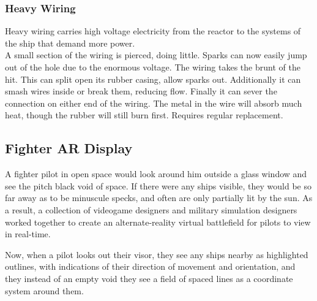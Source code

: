\documentclass[a4paper]{article}
\begin{document}
\vspace{-0.5cm} \hspace{-18pt} \subsubsection{Heavy Wiring} \label{grid_heavy_wiring} \vspace{-0.2cm}
Heavy wiring carries high voltage electricity from the reactor to the systems of the ship that demand more power.
\\ \pbhw
{A small section of the wiring is pierced, doing little. Sparks can now easily jump out of the hole due to the enormous voltage.}
{The wiring takes the brunt of the hit. This can split open its rubber casing, allow sparks out. Additionally it can smash wires inside or break them, reducing flow. Finally it can sever the connection on either end of the wiring.}
{The metal in the wire will absorb much heat, though the rubber will still burn first.}
{Requires regular replacement.}



\subsection{Fighter AR Display} \label{fighter}

A fighter pilot in open space would look around him outside a glass window and see the pitch black void of space. If there were any ships visible, they would be so far away as to be minuscule specks, and often are only partially lit by the sun. As a result, a collection of videogame designers and military simulation designers worked together to create an alternate-reality virtual battlefield for pilots to view in real-time.

Now, when a pilot looks out their visor, they see any ships nearby as highlighted outlines, with indications of their direction of movement and orientation, and they instead of an empty void they see a field of spaced lines as a coordinate system around them.
\end{document}
